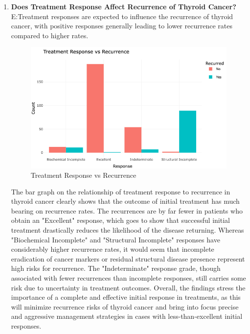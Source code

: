\documentclass[12pt]{article}
\begin{document}
\begin{enumerate}
\newpage

\item \textbf{Does Treatment Response Affect Recurrence of Thyroid Cancer?}\\ 
 E:Treatment responses are expected to influence the recurrence of thyroid cancer, with positive responses generally leading to lower recurrence rates compared to higher rates. 

\begin{figure}[h]
        \vspace{5pt}
        \centering
        \includegraphics[width=1.1\textwidth]{response vs recurrence.png}  
        \caption{Treatment Response vs Recurrence}
            \label{fig:example}
       \vspace{0.5cm}
    \end{figure}

    The bar graph on the relationship of treatment response to recurrence in thyroid cancer clearly shows that the outcome of initial treatment has much bearing on recurrence rates. The recurrences are by far fewer in patients who obtain an "Excellent" response, which goes to show that successful initial treatment drastically reduces the likelihood of the disease returning. Whereas "Biochemical Incomplete" and "Structural Incomplete" responses have considerably higher recurrence rates, it would seem that incomplete eradication of cancer markers or residual structural disease presence represent high risks for recurrence. The "Indeterminate" response grade, though associated with fewer recurrences than incomplete responses, still carries some risk due to uncertainty in treatment outcomes. Overall, the findings stress the importance of a complete and effective initial response in treatments, as this will minimize recurrence risks of thyroid cancer and bring into focus precise and aggressive management strategies in cases with less-than-excellent initial responses.


\end{enumerate}
\end{document}
